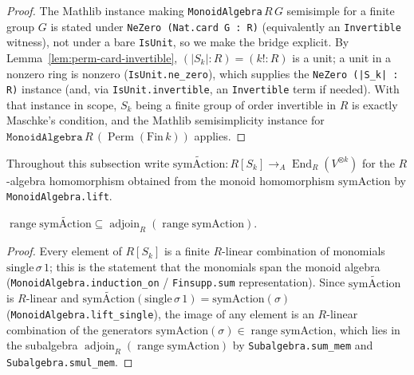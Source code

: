 \begin{proof}
    The Mathlib instance making \texttt{MonoidAlgebra}$\,R\,G$ semisimple for a finite group $G$
    is stated under \texttt{NeZero (Nat.card G : R)} (equivalently an \texttt{Invertible} witness),
    not under a bare \texttt{IsUnit}, so we make the bridge explicit. By
    Lemma~\ref{lem:perm-card-invertible}, $(|S_k| : R) = (k! : R)$ is a unit; a unit in a nonzero
    ring is nonzero (\texttt{IsUnit.ne\_zero}), which supplies the \texttt{NeZero (|S_k| : R)}
    instance (and, via \texttt{IsUnit.invertible}, an \texttt{Invertible} term if needed). With that
    instance in scope, $S_k$ being a finite group of order invertible in $R$ is exactly Maschke's
    condition, and the Mathlib semisimplicity instance for $\texttt{MonoidAlgebra}\,R\,((\,k))$ applies.
\end{proof}

Throughout this subsection write $ : R[S_k] \to_{A}
_R(V^{\otimes k})$ for the $R$-algebra homomorphism obtained from the monoid
homomorphism $$ by \texttt{MonoidAlgebra.lift}.

\begin{lemma}
    \label{lem:lift-range-le-adjoin}
    $
      \subseteq {}_R()$.
\end{lemma}
\begin{proof}
    Every element of $R[S_k]$ is a finite $R$-linear combination of monomials
    $\,\sigma\,1$; this is the statement that the monomials span the monoid algebra
    (\texttt{MonoidAlgebra.induction\_on} / \texttt{Finsupp.sum} representation). Since
    $$ is $R$-linear and
    $(\,\sigma\,1) = (\sigma)$
    (\texttt{MonoidAlgebra.lift\_single}), the image of any element is an $R$-linear combination of the
    generators $(\sigma) \in {}$, which lies in the
    subalgebra $_R()$ by
    \texttt{Subalgebra.sum\_mem} and \texttt{Subalgebra.smul\_mem}.
\end{proof}

